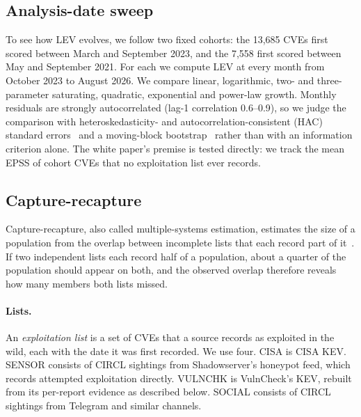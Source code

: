 \subsection{Analysis-date sweep}\label{sec:m-sweep}

To see how LEV evolves, we follow two fixed cohorts: the 13,685 CVEs first
scored between March and September 2023, and the 7,558 first scored between
May and September 2021. For each we compute LEV at every month from October
2023 to August 2026. We compare linear, logarithmic, two- and three-parameter
saturating, quadratic, exponential and power-law growth. Monthly residuals are
strongly autocorrelated (lag-1 correlation 0.6--0.9), so we judge the comparison
with heteroskedasticity- and autocorrelation-consistent (HAC) standard
errors~\cite{newey1987hac} and a moving-block
bootstrap~\cite{kunsch1989bootstrap} rather than with an information criterion
alone.
The white paper's premise is tested directly: we track the mean EPSS of cohort
CVEs that no exploitation list ever records.

\subsection{Capture-recapture}\label{sec:m-cr}

Capture-recapture, also called multiple-systems estimation, estimates the size
of a population from the overlap between incomplete lists that each record part
of it~\cite{iwgdmf1995,bird2018mse}. If two independent lists each record half
of a population, about a quarter of the population should appear on both, and
the observed overlap therefore reveals how many members both lists missed.

\paragraph{Lists.} An \emph{exploitation list} is a set of CVEs that a source
records as exploited in the wild, each with the date it was first recorded. We
use four. CISA is CISA KEV. SENSOR consists of CIRCL sightings from
Shadowserver's honeypot feed, which records attempted exploitation directly.
VULNCHK is VulnCheck's KEV, rebuilt from its per-report evidence as described
below. SOCIAL consists of CIRCL sightings from Telegram and similar channels.

